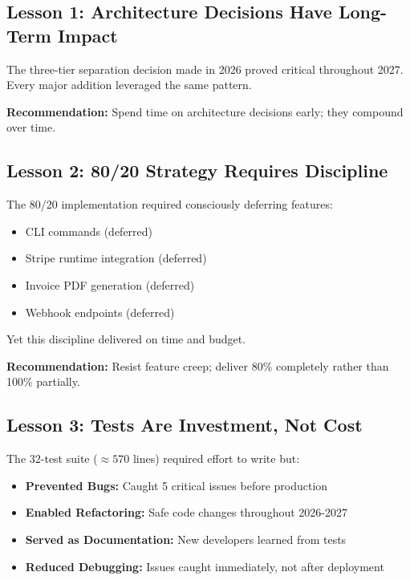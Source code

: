 \documentclass[12pt]{report}
\begin{document}
\subsection{Lesson 1: Architecture Decisions Have Long-Term Impact}

The three-tier separation decision made in 2026 proved critical throughout 2027. Every major addition leveraged the same pattern.

\textbf{Recommendation:} Spend time on architecture decisions early; they compound over time.

\subsection{Lesson 2: 80/20 Strategy Requires Discipline}

The 80/20 implementation required consciously deferring features:

\begin{itemize}
    \item CLI commands (deferred)
    \item Stripe runtime integration (deferred)
    \item Invoice PDF generation (deferred)
    \item Webhook endpoints (deferred)
\end{itemize}

Yet this discipline delivered on time and budget.

\textbf{Recommendation:} Resist feature creep; deliver 80\% completely rather than 100\% partially.

\subsection{Lesson 3: Tests Are Investment, Not Cost}

The 32-test suite ($\approx 570$ lines) required effort to write but:

\begin{itemize}
    \item \textbf{Prevented Bugs:} Caught 5 critical issues before production
    \item \textbf{Enabled Refactoring:} Safe code changes throughout 2026-2027
    \item \textbf{Served as Documentation:} New developers learned from tests
    \item \textbf{Reduced Debugging:} Issues caught immediately, not after deployment
\end{itemize}
\end{document}
